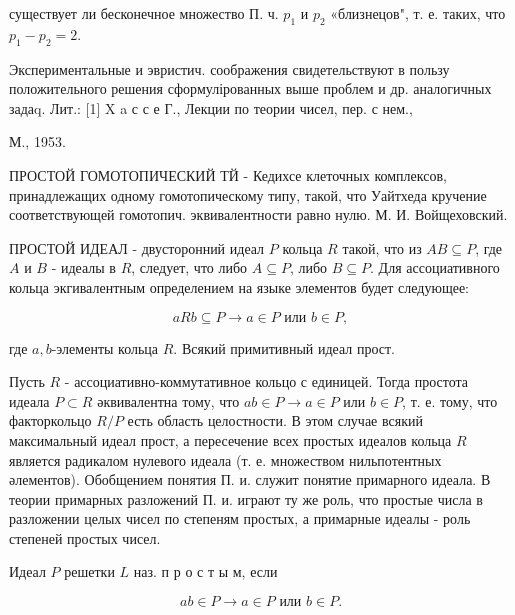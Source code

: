 \documentclass[10pt]{article}
\begin{document}
существует ли бесконечное множество П. ч. $p_{1}$ и $p_{2}$ «близнецов", т. е. таких, что $p_{1}-p_{2}=2$.



Экспериментальные и эвристич. соображения свидетельствуют в пользу положительного решения сформулірованных выше проблем и др. аналогичных задаq. Лит.: [1] X a с с е Г., Лекции по теории чисел, пер. с нем.,

М., 1953.



ПРОСТОЙ ГОМОТОПИЧЕСКИЙ ТЙ - Кедихсе клеточных комплексов, принадлежащих одному гомотопическому типу, такой, что Уайтхеда кручение соответствующей гомотопич. эквивалентности равно нулю. $М$. И. Войщеховский.



ПРОСТОЙ ИДЕАЛ - двусторонний идеал $P$ кольца $R$ такой, что из $A B \subseteq P$, где $A$ и $B$ - идеалы в $R$, следует, что либо $A \subseteq P$, либо $B \subseteq P$. Для ассоциативного кольца экгивалентным определением на языке элементов будет следующее:



\[

a R b \subseteq P \longrightarrow a \in P \text { или } b \in P,

\]



где $a, b$-элементы кольца $R$. Всякий примитивный идеал прост.



Пусть $R$ - ассоциативно-коммутативное кольцо с единицей. Тогда простота идеала $P \subset R$ әквивалентна тому, что $a b \in P \rightarrow a \in P$ или $b \in P$, т. е. тому, что факторкольцо $R / P$ есть область целостности. В этом случае всякий максимальный идеал прост, а пересечение всех простых идеалов кольца $R$ является радикалом нулевого идеала (т. е. множеством нильпотентных әлементов). Обобщением понятия П. и. служит понятие примарного идеала. В теории примарных разложений П. и. играют ту же роль, что простые числа в разложении целых чисел по степеням простых, а примарные идеалы - роль степеней простых чисел.



Идеал $P$ решетки $L$ наз. п р о с т ы м, если



\[

a b \in P \longrightarrow a \in P \text { или } b \in P .

\]
\end{document}
